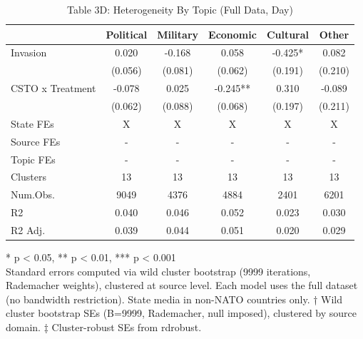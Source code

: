 \begin{table}[!t]
\caption{Table 3D: Heterogeneity By Topic (Full Data, Day)} 
\fontsize{12.0pt}{14.4pt}\selectfont
\begin{tabular*}{\linewidth}{@{\extracolsep{\fill}}lccccc}
\toprule
  & Political & Military & Economic & Cultural & Other \\ 
\midrule\addlinespace[2.5pt]
Invasion & 0.020 & -0.168 & 0.058 & -0.425* & 0.082 \\ 
 & (0.056) & (0.081) & (0.062) & (0.191) & (0.210) \\ 
CSTO x Treatment & -0.078 & 0.025 & -0.245** & 0.310 & -0.089 \\ 
{} & {(0.062)} & {(0.088)} & {(0.068)} & {(0.197)} & {(0.211)} \\ 
State FEs & X & X & X & X & X \\ 
Source FEs & - & - & - & - & - \\ 
Topic FEs & - & - & - & - & - \\ 
Clusters & 13 & 13 & 13 & 13 & 13 \\ 
Num.Obs. & 9049 & 4376 & 4884 & 2401 & 6201 \\ 
R2 & 0.040 & 0.046 & 0.052 & 0.023 & 0.030 \\ 
R2 Adj. & 0.039 & 0.044 & 0.051 & 0.020 & 0.029 \\ 
\bottomrule
\end{tabular*}
\begin{minipage}{\linewidth}
* p < 0.05, ** p < 0.01, *** p < 0.001\\
Standard errors computed via wild cluster bootstrap (9999 iterations, Rademacher
weights), clustered at source level. Each model uses the full dataset (no
bandwidth restriction). State media in non-NATO countries only. † Wild cluster
bootstrap SEs (B=9999, Rademacher, null imposed), clustered by source domain. ‡
Cluster-robust SEs from rdrobust.\\
\end{minipage}
\end{table}

